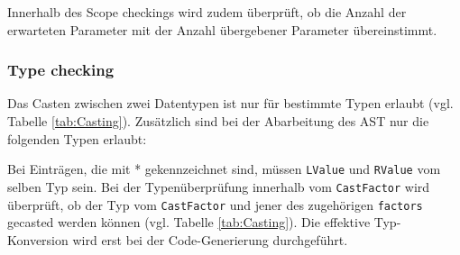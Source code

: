 \documentclass[10pt, a4paper, twocolumn]{article} %
\begin{document}
Innerhalb des Scope checkings wird zudem überprüft, ob die Anzahl der erwarteten Parameter mit der Anzahl übergebener Parameter übereinstimmt.

\subsubsection*{Type checking}
Das Casten zwischen zwei Datentypen ist nur für bestimmte Typen erlaubt (vgl. Tabelle \ref{tab:Casting}).
Zusätzlich sind bei der Abarbeitung des AST nur die folgenden Typen erlaubt:

\begin{table}[h]
    \centering
    \tiny
    \caption{Erlaubte Typen im AST}
    \label{tab:types}
\end{table}
Bei Einträgen, die mit * gekennzeichnet sind, müssen \texttt{LValue} und \texttt{RValue} vom selben Typ sein.
Bei der Typenüberprüfung innerhalb vom \texttt{CastFactor} wird überprüft, ob der Typ vom \texttt{CastFactor} und jener des zugehörigen \texttt{factors} gecasted werden können (vgl. Tabelle \ref{tab:Casting}).
Die effektive Typ-Konversion wird erst bei der Code-Generierung durchgeführt.
\end{document}
